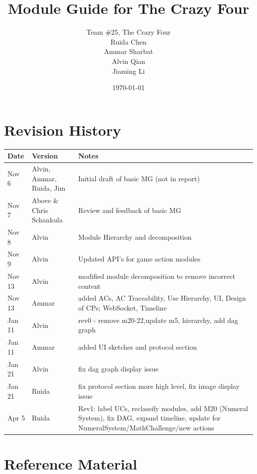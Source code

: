 \documentclass[12pt, titlepage]{article}
\begin{document}
\title{Module Guide for The Crazy Four} 
\author{
    Team \#25, The Crazy Four \\[1ex]
    Ruida Chen \\
    Ammar Sharbat \\
    Alvin Qian \\
    Jiaming Li
}
\date{\today}

\maketitle


\section{Revision History}

\begin{tabularx}{\textwidth}{p{3cm}p{2cm}X}
\toprule {\bf Date} & {\bf Version} & {\bf Notes}\\
\midrule
Nov 6 & Alvin, Ammar, Ruida, Jim & Initial draft of basic MG (not in report)\\
Nov 7 & Above \& Chris Schankula & Review and feedback of basic MG\\
Nov 8 & Alvin & Module Hierarchy and decomposition\\
Nov 9 & Alvin & Updated API's for game action modules\\
Nov 13 & Alvin & modified module decomposition to remove incorrect content\\
Nov 13 & Ammar & added ACs, AC Traceability, Use Hierarchy, UI, Design of CPs; WebSocket, Timeline\\
Jan 11 & Alvin & rev0 - remove m20-22,update m5, hierarchy, add dag graph\\
Jan 11 & Ammar & added UI sketches and protocol section\\
Jan 21 & Alvin & fix dag graph display issue\\
Jan 21 & Ruida & fix protocol section more high level, fix image display issue\\
Apr 5 & Ruida & Rev1: label UCs, reclassify modules, add M20 (Numeral System), fix DAG, expand timeline, update for NumeralSystem/MathChallenge/new actions\\

\bottomrule
\end{tabularx}

\newpage

\section{Reference Material}
\end{document}
